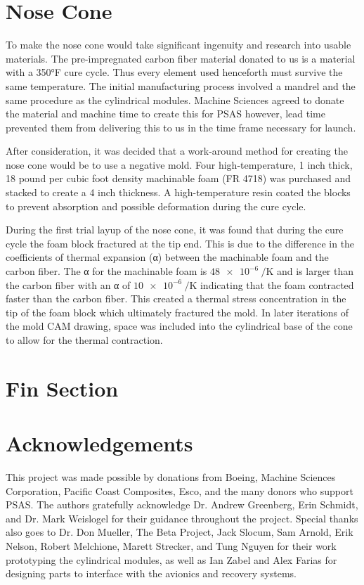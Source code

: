 \documentclass{aiaa-tc}%
\begin{document}
\section{Nose Cone}\label{sec:noseCone}

To make the nose cone would take significant ingenuity and research into usable materials. The pre-impregnated carbon fiber material donated to us is a material with a 350°F cure cycle. Thus every element used henceforth must survive the same temperature. The initial manufacturing process involved a mandrel and the same procedure as the cylindrical modules. Machine Sciences agreed to donate the material and machine time to create this for PSAS however, lead time prevented them from delivering this to us in the time frame necessary for launch. 

After consideration, it was decided that a work-around method for creating the nose cone would be to use a negative mold. Four high-temperature, 1 inch thick, 18 pound per cubic foot density machinable foam (FR 4718) was purchased and stacked to create a 4 inch thickness. A high-temperature resin coated the blocks to prevent absorption and possible deformation during the cure cycle.

During the first trial layup of the nose cone, it was found that during the cure cycle the foam block fractured at the tip end. This is due to the difference in the coefficients of thermal expansion (α) between the machinable foam and the carbon fiber. The α for the machinable foam is $\SI{48e-6}{\per\kelvin}$ and is larger than the carbon fiber with an α of $\SI{10e-6}{\per\kelvin}$ indicating that the foam contracted faster than the carbon fiber. This created a thermal stress concentration in the tip of the foam block which ultimately fractured the mold. In later iterations of the mold CAM drawing, space was included into the cylindrical base of the cone to allow for the thermal contraction.

\section{Fin Section}

\section{Acknowledgements}

This project was made possible by donations from Boeing, Machine Sciences Corporation, Pacific Coast Composites, Esco, and the many donors who support PSAS.
The authors gratefully acknowledge Dr. Andrew Greenberg, Erin Schmidt, and Dr. Mark Weislogel for their guidance throughout the project.
Special thanks also goes to Dr. Don Mueller, The Beta Project, Jack Slocum, Sam Arnold, Erik Nelson, Robert Melchione, Marett Strecker, and Tung Nguyen for their work prototyping the cylindrical modules, as well as Ian Zabel and Alex Farias for designing parts to interface with the avionics and recovery systems.

\end{document}
